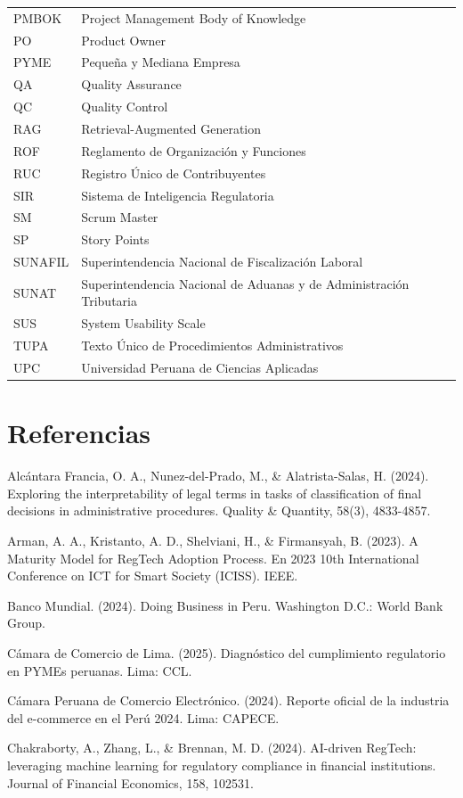 \documentclass[12pt,a4paper,oneside]{report}
\begin{document}
\begin{longtable}[]{@{}
  >{\raggedright\arraybackslash}p{}
  >{\raggedright\arraybackslash}p{}@{}}
PMBOK & Project Management Body of Knowledge \\
PO & Product Owner \\
PYME & Pequeña y Mediana Empresa \\
QA & Quality Assurance \\
QC & Quality Control \\
RAG & Retrieval-Augmented Generation \\
ROF & Reglamento de Organización y Funciones \\
RUC & Registro Único de Contribuyentes \\
SIR & Sistema de Inteligencia Regulatoria \\
SM & Scrum Master \\
SP & Story Points \\
SUNAFIL & Superintendencia Nacional de Fiscalización Laboral \\
SUNAT & Superintendencia Nacional de Aduanas y de Administración Tributaria \\
SUS & System Usability Scale \\
TUPA & Texto Único de Procedimientos Administrativos \\
UPC & Universidad Peruana de Ciencias Aplicadas \\
\end{longtable}


\section*{Referencias}\label{referencias}

Alcántara Francia, O. A., Nunez-del-Prado, M., \& Alatrista-Salas, H. (2024). Exploring the interpretability of legal terms in tasks of classification of final decisions in administrative procedures. Quality \& Quantity, 58(3), 4833-4857.

Arman, A. A., Kristanto, A. D., Shelviani, H., \& Firmansyah, B. (2023). A Maturity Model for RegTech Adoption Process. En 2023 10th International Conference on ICT for Smart Society (ICISS). IEEE.

Banco Mundial. (2024). Doing Business in Peru. Washington D.C.: World Bank Group.

Cámara de Comercio de Lima. (2025). Diagnóstico del cumplimiento regulatorio en PYMEs peruanas. Lima: CCL.

Cámara Peruana de Comercio Electrónico. (2024). Reporte oficial de la industria del e-commerce en el Perú 2024. Lima: CAPECE.

Chakraborty, A., Zhang, L., \& Brennan, M. D. (2024). AI-driven RegTech: leveraging machine learning for regulatory compliance in financial institutions. Journal of Financial Economics, 158, 102531.
\end{document}
